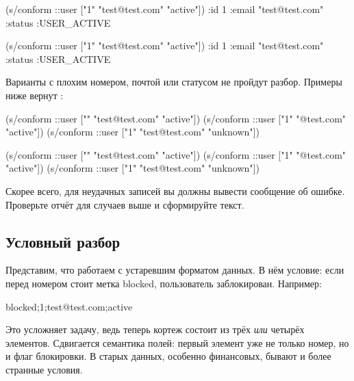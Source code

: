 \ifnarrow

\begin{clojure}
(s/conform ::user
  ["1" "test@test.com" "active"])
{:id 1
 :email "test@test.com"
 :status :USER_ACTIVE}
\end{clojure}

\else

\begin{clojure}
(s/conform ::user ["1" "test@test.com" "active"])
{:id 1
 :email "test@test.com"
 :status :USER_ACTIVE}
\end{clojure}

\fi

Варианты с плохим номером, почтой или статусом не пройдут разбор. Примеры ниже
вернут :

\ifnarrow

\begin{clojure}
(s/conform ::user
  ["" "test@test.com" "active"])
(s/conform ::user
  ["1" "@test.com" "active"])
(s/conform ::user
  ["1" "test@test.com" "unknown"])
\end{clojure}

\else

\begin{clojure}
(s/conform ::user ["" "test@test.com" "active"])
(s/conform ::user ["1" "@test.com" "active"])
(s/conform ::user ["1" "test@test.com" "unknown"])
\end{clojure}

\fi

Скорее всего, для неудачных записей вы должны вывести сообщение об
ошибке. Проверьте отчёт  для случаев выше и сформируйте текст.

\subsection{Условный разбор}

Представим, что работаем с устаревшим форматом данных. В нём условие: если
перед номером стоит метка blocked, пользователь заблокирован. Например:

\begin{text}
blocked;1;test@test.com;active
\end{text}

Это усложняет задачу, ведь теперь кортеж состоит из трёх \emph{или} четырёх
элементов. Сдвигается семантика полей: первый элемент уже не только номер, но и
флаг блокировки. В старых данных, особенно финансовых, бывают и более странные
условия.

